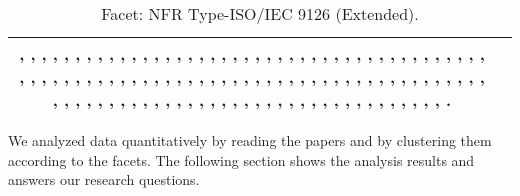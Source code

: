 \begin{table}
\begin{tabular}{|c|c|}
{\cite{p001}, \cite{p002}, \cite{p003}, \cite{p004}, \cite{p005}, \cite{p006}, \cite{p007}, \cite{p008}, \cite{p009}, \cite{p010}, \cite{p011}, \cite{p014}, \cite{p016}, \cite{p018}, \cite{p019}, \cite{p021}, \cite{p023}, \cite{p024}, \cite{p025}, \cite{p028}, \cite{p029}, \cite{p030}, \cite{p031}, \cite{p032}, \cite{p033}, \cite{p034}, \cite{p035}, \cite{p036}, \cite{p038}, \cite{p039}, \cite{p040}, \cite{p042}, \cite{p046}, \cite{p047}, \cite{p048}, \cite{p049}, \cite{p051}, \cite{p052}, \cite{p053}, \cite{p054}, \cite{p055}, \cite{p057}, \cite{p058}, \cite{p059}, \cite{p060}, \cite{p061}, \cite{p065}, \cite{p066}, \cite{p067}, \cite{p068}, \cite{p069}, \cite{p070}, \cite{p071}, \cite{p073}, \cite{p074}, \cite{p075}, \cite{p076}, \cite{p077}, \cite{p078}, \cite{p079}, \cite{p080}, \cite{p082}, \cite{p083}, \cite{p084}, \cite{p085}, \cite{p086}, \cite{p087}, \cite{p088}, \cite{p089}, \cite{p090}, \cite{p094}, \cite{p096}, \cite{p097}, \cite{p098}, \cite{p099}, \cite{p100}, \cite{p101}, \cite{p102}, \cite{p103}, \cite{p104}, \cite{p105}, \cite{p106}, \cite{p107}, \cite{p108}, \cite{p109}, \cite{p111}, \cite{p112}, \cite{p113}, \cite{p117}, \cite{p121}, \cite{p123}, \cite{p124}, \cite{p125}, \cite{p126}, \cite{p127}, \cite{p128}, \cite{p131}, \cite{p134}, \cite{p137}, \cite{p140}, \cite{p143}, \cite{p144}, \cite{p145}, \cite{p146}, \cite{p148}, \cite{p151}, \cite{p153}, \cite{p154}, \cite{p155}, \cite{p156}, \cite{p157}, \cite{p158}, \cite{p159}, \cite{p162}, \cite{p163}, \cite{p164}, \cite{p165}, \cite{p167}, \cite{p169}, \cite{p170}.
}
\\ \hline
\end{tabular}
\caption{\label{table:biblioMTMM} Facet: NFR Type-ISO/IEC 9126 (Extended).}
\end{table}


We analyzed data quantitatively by reading the papers and by clustering them according to the facets. The following section shows the analysis results and answers our research questions.